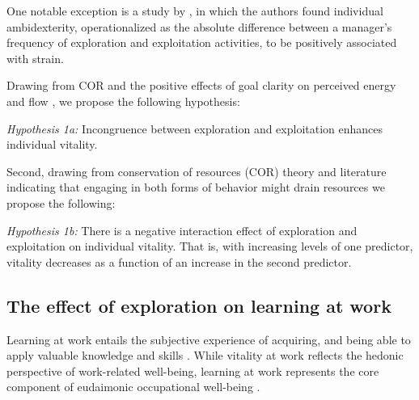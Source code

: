 \documentclass[man, 12pt, a4paper, noextraspace]{apa6}
\begin{document}
One notable exception is a study by \textcite{Keller2015}, in which the authors found individual ambidexterity, operationalized as the absolute difference between a manager’s frequency of exploration and exploitation activities, to be positively associated with strain. \par
Drawing from COR \parencite{Hobfoll.1989} and the positive effects of goal clarity on perceived energy and flow \parencite[e.g.,][]{Nielsen2010, Salanova2006}, we propose the following hypothesis: \par 

\textit{Hypothesis 1a:} Incongruence between exploration and exploitation enhances individual vitality. \par 

Second, drawing from conservation of resources (COR) theory \parencite{Hobfoll.1989} and literature indicating that engaging in both forms of behavior might drain resources \parencite{Hunter2017, Keller2015} we propose the following: 

\textit{Hypothesis 1b:} There is a negative interaction effect of exploration and exploitation on individual vitality. That is, with increasing levels of one predictor, vitality decreases as a function of an increase in the second predictor. 

\subsection{The effect of exploration on learning at work}

Learning at work entails the subjective experience of acquiring, and being able to apply valuable knowledge and skills \parencite{Spreitzer.2005b}. 
While vitality at work reflects the hedonic perspective of work-related well-being, learning at work represents the core component of eudaimonic occupational well-being \parencite{Spreitzer.2005b}. \par 
\end{document}
